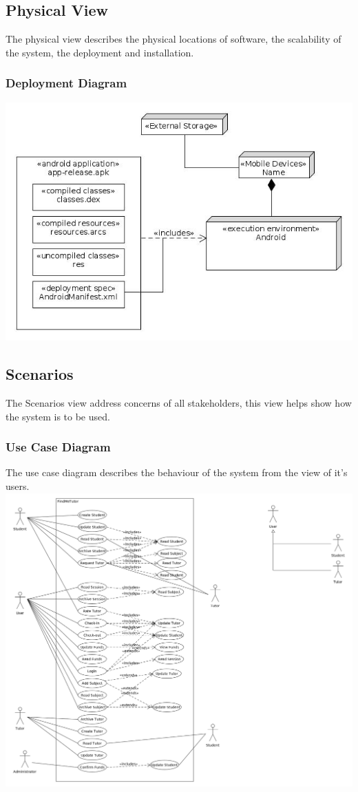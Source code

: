 \documentclass[12pt]{article}
\begin{document}
\subsection{Physical View}
The physical view describes the physical locations of software, the scalability of the system, the deployment and installation.
\subsubsection{Deployment Diagram}

\includegraphics[width=140mm]{./Deployment.jpg}

\newpage

\subsection{Scenarios}
The Scenarios view address concerns of all stakeholders, this view helps show how the system is to be used.
\subsubsection{Use Case Diagram}
The use case diagram describes the behaviour of the system from the view of it's users.\\
\includegraphics[width=170mm]{./Use_Case_Diagram.png}
\end{document}
